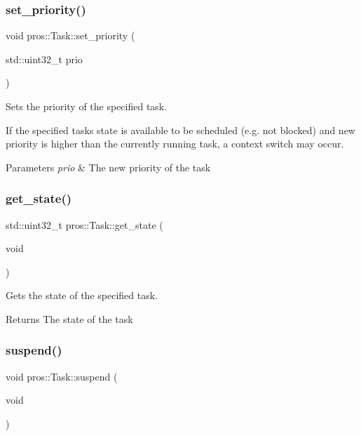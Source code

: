 \subsubsection{\texorpdfstring{set\+\_\+priority()}{set\_priority()}}
{\footnotesize\ttfamily void pros\+::\+Task\+::set\+\_\+priority (\begin{DoxyParamCaption}\item[{std\+::uint32\+\_\+t}]{prio }\end{DoxyParamCaption})}



Sets the priority of the specified task. 

If the specified task\textquotesingle{}s state is available to be scheduled (e.\+g. not blocked) and new priority is higher than the currently running task, a context switch may occur.


\begin{DoxyParams}{Parameters}
{\em prio} & The new priority of the task \\
\hline
\end{DoxyParams}
\mbox{\label{classpros_1_1Task_a45f0b63eec57e7fe8adf3876988588bf}} 
\subsubsection{\texorpdfstring{get\+\_\+state()}{get\_state()}}
{\footnotesize\ttfamily std\+::uint32\+\_\+t pros\+::\+Task\+::get\+\_\+state (\begin{DoxyParamCaption}\item[{void}]{ }\end{DoxyParamCaption})}



Gets the state of the specified task. 

\begin{DoxyReturn}{Returns}
The state of the task 
\end{DoxyReturn}
\mbox{\label{classpros_1_1Task_a89005762dcd3026c953ae5eedd7ecd97}} 
\subsubsection{\texorpdfstring{suspend()}{suspend()}}
{\footnotesize\ttfamily void pros\+::\+Task\+::suspend (\begin{DoxyParamCaption}\item[{void}]{ }\end{DoxyParamCaption})}



